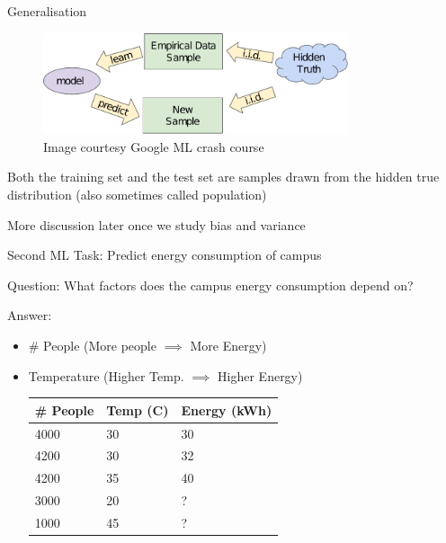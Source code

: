\documentclass[usenames,dvipsnames]{beamer}
\begin{document}
\begin{frame}{Generalisation}
\begin{figure}
	\centering
	\includegraphics[width=0.8\textwidth]{../assets/accuracy-convention/diagrams/train-test.pdf}
	\caption{Image courtesy Google ML crash course}
	\label{fig:train-test}
\end{figure}

\pause Both the training set and the test set are samples drawn from the hidden true distribution (also sometimes called population)

\pause More discussion later once we study bias and variance
\end{frame}

\begin{frame}{Second ML Task: Predict energy consumption of campus}

Question: What factors does the campus energy consumption depend on?

Answer:\begin{itemize}
	\item \pause \# People (More people $\implies$ More Energy)
	\item \pause Temperature (Higher Temp. $\implies$ Higher Energy)

\pause \begin{table}[]
	\begin{tabular}{|l|l||l|}
		\hline 
		
		\textbf{\# People} & \textbf{Temp (C)} &  \textbf{Energy (kWh)} \\ \hline 
		
		4000 & 30 & 30 \\
		4200 & 30 & 32 \\
		4200 & 35 & 40 \\ \hline
		3000 & 20& ? \\
		1000 & 45 & ? \\ \hline          
	\end{tabular}
\end{table}	
\end{itemize}

\end{frame}
\end{document}
